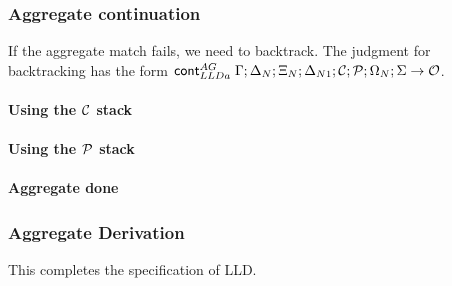 

\subsubsection{Aggregate continuation}

If the aggregate match fails, we need to backtrack. The judgment for
backtracking has the form $\mathsf{cont}_{LLDa}^{AG} \; \Gamma; \Delta_N; \Xi_N; \Delta_{N1};
\mathcal{C}; \mathcal{P}; \Omega_N; \Sigma \rightarrow \mathcal{O}$.

\paragraph{Using the $\mathcal{C}$ stack}



\paragraph{Using the $\mathcal{P}$ stack}



\paragraph{Aggregate done}



\subsubsection{Aggregate Derivation}



This completes the specification of LLD.
